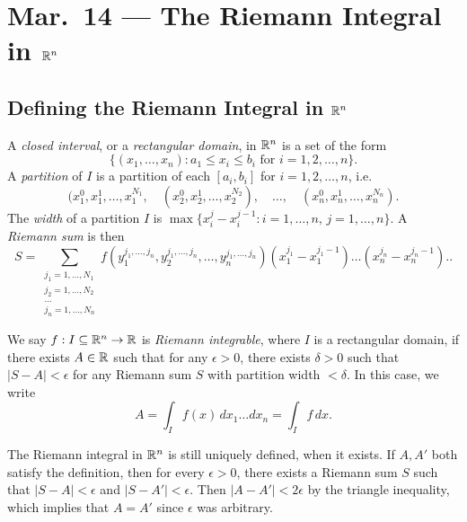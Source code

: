 \chapter{Mar.~14 --- The Riemann Integral in \texorpdfstring{$\mathbb{R}^n$}{Rn}}

\section{Defining the Riemann Integral in \texorpdfstring{$\mathbb{R}^n$}{Rn}}

\begin{definition}
  A \emph{closed interval}, or a \emph{rectangular domain},
  in $\mathbb{R}^n$ is a set of the form
  \[
    \{
      (x_1, \dots, x_n) : a_1 \le x_i \le b_i \text{ for } i = 1, 2, \dots, n
    \}.
  \]
  A \emph{partition} of $I$ is a partition of each
  $[a_i, b_i]$ for $i = 1, 2, \dots, n$, i.e.
  \[
    (x_1^0, x_1^1, \dots, x_1^{N_1}, \quad (x_2^0, x_2^1, \dots, x_2^{N_2}), \quad \dots, \quad (x_n^0, x_n^1, \dots, x_n^{N_n}).
  \]
  The \emph{width} of a partition $I$ is
  $\max\{x_i^{j} - x_{i}^{j - 1} : i = 1, \dots, n,\, j = 1, \dots, n\}$. A \emph{Riemann sum} is then
  \[
    S = \sum_{\substack{j_1 = 1, \dots, N_1 \\ j_2 = 1, \dots, N_2 \\ \dots \\ j_n = 1, \dots , N_n}} f(y_1^{j_1, \dots, j_n}, y_2^{j_1, \dots, j_n}, \dots, y_n^{j_1, \dots, j_n}) (x_1^{j_1} - x_1^{j_1 - 1}) \dots (x_n^{j_n} - x_n^{j_n - 1}).
  .\]
\end{definition}

\begin{definition}
  We say $f : I \subseteq \mathbb{R}^n \to \mathbb{R}$ is \emph{Riemann integrable}, where $I$ is a rectangular domain,
  if there exists $A \in \mathbb{R}$ such that for any
  $\epsilon > 0$, there exists $\delta > 0$ such that
  $|S - A| < \epsilon$ for any Riemann sum $S$ with partition
  width $< \delta$. In this case, we write
  \[
    A = \int_{I} f(x)\, dx_{1} \dots dx_{n}
    = \int_{I} f\, dx.
  \]
\end{definition}

\begin{remark}
  The Riemann integral in $\mathbb{R}^n$ is still uniquely defined,
  when it exists. If $A, A'$ both satisfy the definition,
  then for every $\epsilon > 0$, there exists a Riemann
  sum $S$ such that $|S - A| < \epsilon$ and $|S - A'| < \epsilon$.
  Then
  $|A - A'| < 2 \epsilon$ by the triangle inequality,
  which implies that
  $A = A'$ since $\epsilon$ was arbitrary.
\end{remark}

